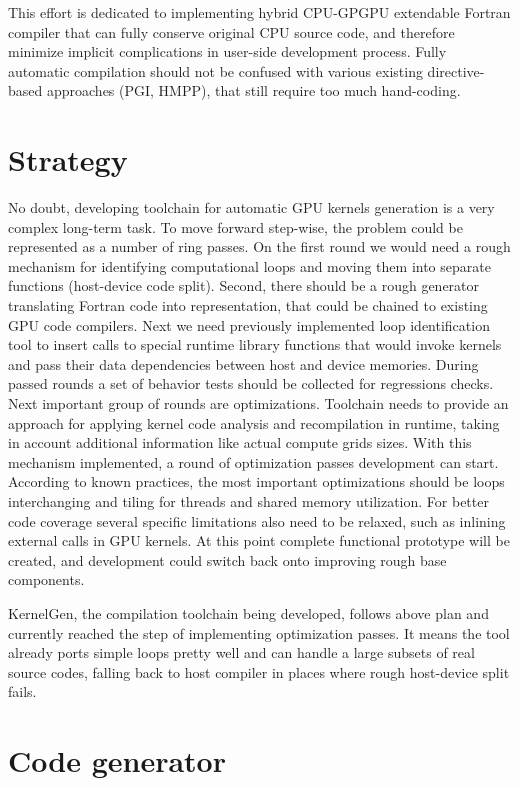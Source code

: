 \documentclass[a4,12pt]{article}
\begin{document}
This effort is dedicated to implementing hybrid CPU-GPGPU extendable Fortran compiler that can fully conserve original CPU source code, and therefore minimize implicit complications in user-side development process. Fully automatic compilation should not be confused with various existing directive-based approaches (PGI, HMPP), that still require too much hand-coding.

\section{Strategy}

No doubt, developing toolchain for automatic GPU kernels generation is a very complex long-term task. To move forward step-wise, the problem could be represented as a number of ring passes. On the first round we would need a rough mechanism for identifying computational loops and moving them into separate functions (host-device code split). Second, there should be a rough generator translating Fortran code into representation, that could be chained to existing GPU code compilers. Next we need previously implemented loop identification tool to insert calls to special runtime library functions that would invoke kernels and pass their data dependencies between host and device memories. During passed rounds a set of behavior tests should be collected for regressions checks. Next important group of rounds are optimizations. Toolchain needs to provide an approach for applying kernel code analysis and recompilation in runtime, taking in account additional information like actual compute grids sizes. With this mechanism implemented, a round of optimization passes development can start. According to known practices, the most important optimizations should be loops interchanging and tiling for threads and shared memory utilization. For better code coverage several specific limitations also need to be relaxed, such as inlining external calls in GPU kernels. At this point complete functional prototype will be created, and development could switch back onto improving rough base components.

KernelGen, the compilation toolchain being developed, follows above plan and currently reached the step of implementing optimization passes. It means the tool already ports simple loops pretty well and can handle a large subsets of real source codes, falling back to host compiler in places where rough host-device split fails.

\section{Code generator}
\end{document}
